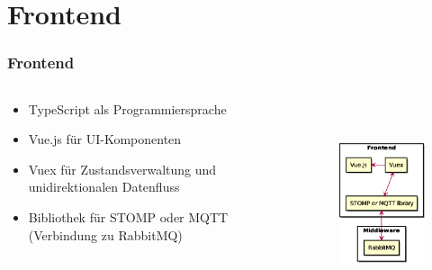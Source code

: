 \section{Frontend}
\begin{frame}
    \frametitle{Frontend}
    \begin{columns}
        \begin{column}{0.48\textwidth}
            \begin{itemize}
                \item TypeScript als Programmiersprache
                \item Vue.js für UI-Komponenten
                \item Vuex für Zustandsverwaltung und unidirektionalen Datenfluss
                \item Bibliothek für STOMP oder MQTT (Verbindung zu RabbitMQ)
            \end{itemize}
        \end{column}
        \begin{column}{0.48\textwidth}
            \begin{figure}
                \centering
                \includegraphics[height=6cm]{media/Frontend.eps}
            \end{figure}
        \end{column}
    \end{columns}
\end{frame}

